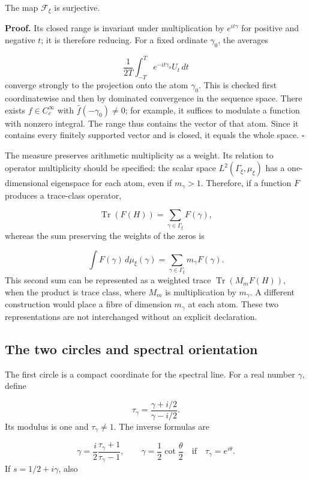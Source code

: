 The map \(\mathcal F_\xi\) is surjective.

\textbf{Proof.} Its closed range is invariant under multiplication by \(e^{it\gamma}\) for positive and negative \(t\); it is therefore reducing. For a fixed ordinate \(\gamma_0\), the averages

\[
\frac1{2T}\int_{-T}^T e^{-it\gamma_0}U_t\,dt
\]
converge strongly to the projection onto the atom \(\gamma_0\). This is checked first coordinatewise and then by dominated convergence in the sequence space. There exists \(f\in C_c^\infty\) with \(\widehat f(-\gamma_0)\neq0\); for example, it suffices to modulate a function with nonzero integral. The range thus contains the vector of that atom. Since it contains every finitely supported vector and is closed, it equals the whole space. \hfill\(\square\)

The measure preserves arithmetic multiplicity as a weight. Its relation to operator multiplicity should be specified: the scalar space \(L^2(\Gamma_\xi,\mu_\xi)\) has a one-dimensional eigenspace for each atom, even if \(m_\gamma>1\). Therefore, if a function \(F\) produces a trace-class operator,

\[
\operatorname{Tr}(F(H))=\sum_{\gamma\in\Gamma_\xi}F(\gamma),
\]
whereas the sum preserving the weights of the zeros is

\[
\int F(\gamma)\,d\mu_\xi(\gamma)
=\sum_{\gamma\in\Gamma_\xi}m_\gamma F(\gamma).
\]
This second sum can be represented as a weighted trace \(\operatorname{Tr}(M_mF(H))\), when the product is trace class, where \(M_m\) is multiplication by \(m_\gamma\). A different construction would place a fibre of dimension \(m_\gamma\) at each atom. These two representations are not interchanged without an explicit declaration.

\subsection{The two circles and spectral orientation}
\label{rz:circulos}
The first circle is a compact coordinate for the spectral line. For a real number \(\gamma\), define

\[
\tau_\gamma=\frac{\gamma+i/2}{\gamma-i/2}.
\]
Its modulus is one and \(\tau_\gamma\neq1\). The inverse formulas are

\[
\gamma=\frac{i}{2}\frac{\tau_\gamma+1}{\tau_\gamma-1},
\qquad
\gamma=\frac12\cot\frac{\theta}{2}
\quad\text{if}\quad\tau_\gamma=e^{i\theta}.
\]
If \(s=1/2+i\gamma\), also

